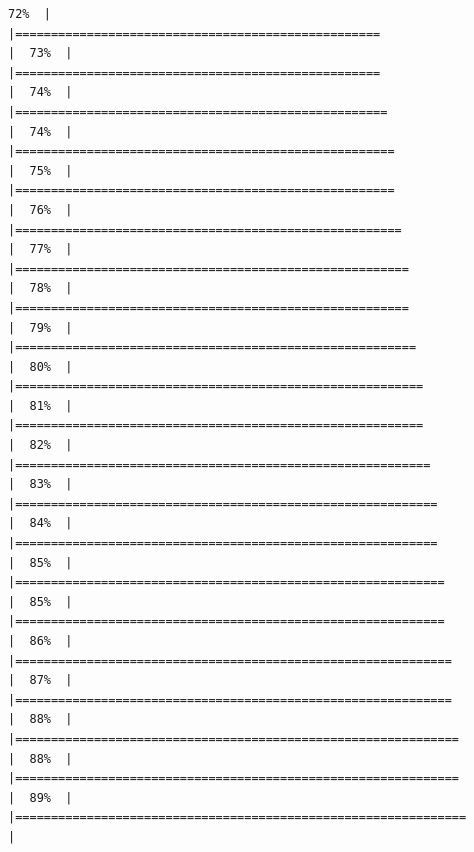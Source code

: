\documentclass[
]{article}
\begin{document}
\begin{verbatim}
72%  |                                                                              |===================================================                   |  73%  |                                                                              |===================================================                   |  74%  |                                                                              |====================================================                  |  74%  |                                                                              |=====================================================                 |  75%  |                                                                              |=====================================================                 |  76%  |                                                                              |======================================================                |  77%  |                                                                              |=======================================================               |  78%  |                                                                              |=======================================================               |  79%  |                                                                              |========================================================              |  80%  |                                                                              |=========================================================             |  81%  |                                                                              |=========================================================             |  82%  |                                                                              |==========================================================            |  83%  |                                                                              |===========================================================           |  84%  |                                                                              |===========================================================           |  85%  |                                                                              |============================================================          |  85%  |                                                                              |============================================================          |  86%  |                                                                              |=============================================================         |  87%  |                                                                              |=============================================================         |  88%  |                                                                              |==============================================================        |  88%  |                                                                              |==============================================================        |  89%  |                                                                              |===============================================================       |  
\end{verbatim}
\end{document}
